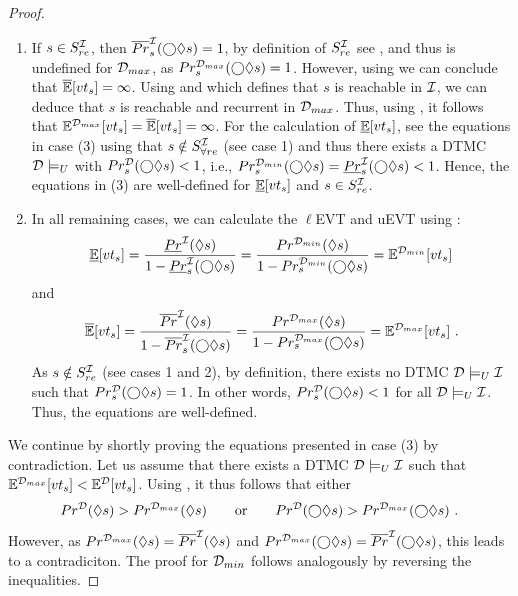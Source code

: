\begin{proof}
\begin{enumerate}
        \item If $s\in S^{\mathcal{I}}_{re}$, then $\overline{Pr}^{\mathcal{I}}_s(\bigcirc\lozenge s) = 1$, by definition of $S_{re}^{\mathcal{I}}$ see , and thus  is undefined for $\mathcal{D}_{max}$, as $Pr^{\mathcal{D}_{max}}_s(\bigcirc\lozenge s) = 1$. However, using  we can conclude that $\mathbb{\overline{E}}[vt_s] = \infty$. Using  and  which defines that $s$ is reachable in $\mathcal{I}$, we can deduce that $s$ is reachable and recurrent in $\mathcal{D}_{max}$. Thus, using , it follows that $\mathbb{E}^{\mathcal{D}_{max}}[vt_s] = \mathbb{\overline{E}}[vt_s] = \infty$. For the calculation of $\mathbb{\underline{E}}[vt_s]$, see the equations in case (3) using that $s\notin S^{\mathcal{I}}_{\forall re}$ (see case 1) and thus there exists a DTMC $\mathcal{D} \models_U$ with $Pr^{\mathcal{D}}_s(\bigcirc\lozenge s) < 1$, i.e., $Pr^{\mathcal{D}_{min}}_s(\bigcirc\lozenge s) = \underline{Pr}^{\mathcal{I}}_s(\bigcirc\lozenge s) < 1$. Hence, the equations in (3) are well-defined for $\mathbb{\underline{E}}[vt_s]$ and $s\in S^{\mathcal{I}}_{re}$.
        
        \item In all remaining cases, we can calculate the $\ell$EVT and uEVT using :
        \[ \mathbb{\underline{E}}[vt_s] = \frac{\underline{Pr}^{\mathcal{I}}(\lozenge s)}{1-\underline{Pr}^{\mathcal{I}}_s(\bigcirc\lozenge s)} = \frac{Pr^{\mathcal{D}_{min}}(\lozenge s)}{1-Pr^{\mathcal{D}_{min}}_s(\bigcirc\lozenge s)} = \mathbb{E}^{\mathcal{D}_{min}}[vt_s]\]
        and
        \[ \mathbb{\overline{E}}[vt_s] = \frac{\overline{Pr}^{\mathcal{I}}(\lozenge s)}{1-\overline{Pr}^{\mathcal{I}}_s(\bigcirc\lozenge s)} = \frac{Pr^{\mathcal{D}_{max}}(\lozenge s)}{1-Pr^{\mathcal{D}_{max}}_s(\bigcirc\lozenge s)} = \mathbb{E}^{\mathcal{D}_{max}}[vt_s]\ .\]
        As $s\notin S_{re}^{\mathcal{I}}$ (see cases 1 and 2), by definition, there exists no DTMC $\mathcal{D} \models_U \mathcal{I}$ such that $Pr^{\mathcal{D}}_s(\bigcirc\lozenge s) = 1$. In other words, $Pr^{\mathcal{D}}_s(\bigcirc\lozenge s) < 1$ for all $\mathcal{D} \models_U \mathcal{I}$. Thus, the equations are well-defined.
    \end{enumerate}

    We continue by shortly proving the equations presented in case (3) by contradiction. Let us assume that there exists a DTMC $\mathcal{D} \models_U \mathcal{I}$ such that $\mathbb{E}^{\mathcal{D}_{max}}[vt_s] < \mathbb{E}^{\mathcal{D}}[vt_s]$. Using , it thus follows that either 
    \[Pr^{\mathcal{D}}(\lozenge s) > Pr^{\mathcal{D}_{max}}(\lozenge s) \qquad \text{or} \qquad Pr^{\mathcal{D}}(\bigcirc\lozenge s) > Pr^{\mathcal{D}_{max}}(\bigcirc\lozenge s)\ .\]
    However, as $Pr^{\mathcal{D}_{max}}(\lozenge s) = \overline{Pr}^{\mathcal{I}}(\lozenge s)$ and $Pr^{\mathcal{D}_{max}}(\bigcirc\lozenge s) = \overline{Pr}^ {\mathcal{I}}(\bigcirc\lozenge s)$, this leads to a contradiciton.
    The proof for $\mathcal{D}_{min}$ follows analogously by reversing the inequalities.


\end{proof}
